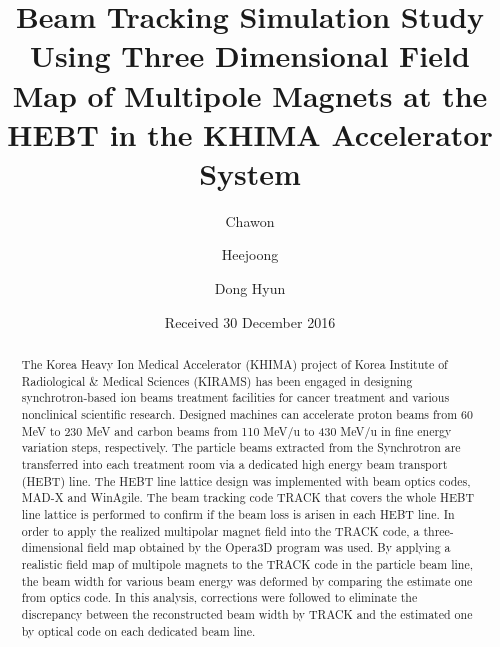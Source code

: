 \documentclass[jkps,preprint,fleqn,showpacs,showkeys,10pt,twocolumn]{revtex4}
\begin{document}
\setcounter{page}{1}
\title[]{Beam Tracking Simulation Study Using Three Dimensional Field Map of Multipole Magnets at the HEBT in the KHIMA Accelerator System}
\author{Chawon }
\author{Heejoong }
\author{Dong Hyun }
\date[]{Received 30 December 2016}
\begin{abstract}
  The Korea Heavy Ion Medical Accelerator (KHIMA) project of Korea Institute of Radiological \& Medical Sciences (KIRAMS) has been engaged in
  designing synchrotron-based ion beams treatment facilities for cancer treatment and various nonclinical scientific research.
  Designed machines can accelerate proton beams from 60 MeV to 230 MeV
  and carbon beams from 110 MeV/u to 430 MeV/u in fine energy variation steps, respectively.
  The particle beams extracted from the Synchrotron are transferred into each treatment room via a dedicated high energy beam transport (HEBT) line.
  The HEBT line lattice design was implemented with beam optics codes, MAD-X and WinAgile.  
  The beam tracking code TRACK that covers the whole HEBT line lattice is performed to confirm if the beam loss is arisen in each HEBT line.  
  In order to apply the realized multipolar magnet field into the TRACK code, a three-dimensional field map obtained by the Opera3D program was used.
  By applying a realistic field map of multipole magnets to the TRACK code in the particle beam line,  
  the beam width for various beam energy was deformed by comparing the estimate one from optics code.
  In this analysis, corrections were followed to eliminate the discrepancy between the reconstructed beam width by TRACK
  and the estimated one by optical code on each dedicated beam line.
\end{abstract}


\maketitle
\end{document}
